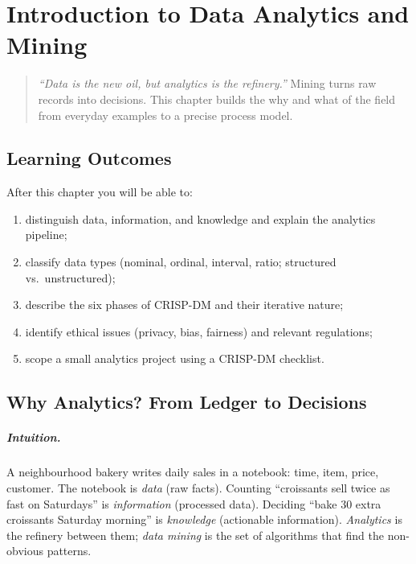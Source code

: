 \chapter{Introduction to Data Analytics and Mining}
\label{ch:intro}

\begin{quote}
\emph{``Data is the new oil, but analytics is the refinery.''} Mining turns raw records into decisions. This chapter builds the why and what of the field from everyday examples to a precise process model.
\end{quote}

\noindent{}
\vspace{0.4em}

\section*{Learning Outcomes}
After this chapter you will be able to:
\begin{enumerate}[label=(L\arabic*)]
    \item distinguish data, information, and knowledge and explain the analytics pipeline;
    \item classify data types (nominal, ordinal, interval, ratio; structured vs.\ unstructured);
    \item describe the six phases of CRISP-DM and their iterative nature;
    \item identify ethical issues (privacy, bias, fairness) and relevant regulations;
    \item scope a small analytics project using a CRISP-DM checklist.
\end{enumerate}

\section{Why Analytics? From Ledger to Decisions}
\label{sec:why-analytics}
\paragraph{Intuition.} A neighbourhood bakery writes daily sales in a notebook: time, item, price, customer. The notebook is \emph{data} (raw facts). Counting ``croissants sell twice as fast on Saturdays'' is \emph{information} (processed data). Deciding ``bake 30 extra croissants Saturday morning'' is \emph{knowledge} (actionable information). \emph{Analytics} is the refinery between them; \emph{data mining} is the set of algorithms that find the non-obvious patterns.

